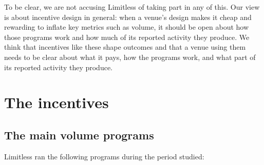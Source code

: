 \documentclass[11pt]{article}
\begin{document}
To be clear, we are not accusing Limitless of taking part in any of this.
Our view is about incentive design in general: when a venue's design makes it cheap and rewarding to inflate key metrics such as volume, it should be open about how those programs work and how much of its reported activity they produce.
We think that incentives like these shape outcomes and that a venue using them needs to be clear about what it pays, how the programs work, and what part of its reported activity they produce.

\section{The incentives}

\subsection{The main volume programs}

Limitless ran the following programs during the period studied:
\end{document}
